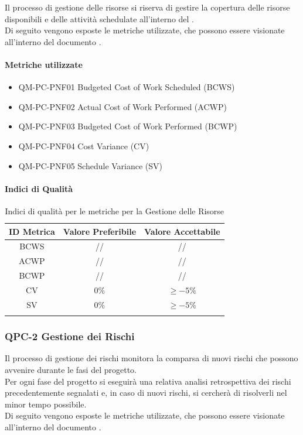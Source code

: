		Il processo di gestione delle risorse si riserva di gestire la copertura delle risorse disponibili e delle attività schedulate all'interno del . \\
		Di seguito vengono esposte le metriche utilizzate, che possono essere visionate all'interno del documento .\\

		\paragraph{Metriche utilizzate}

			\begin{itemize}
				\item QM-PC-PNF01 Budgeted Cost of Work Scheduled (BCWS)
				\item QM-PC-PNF02 Actual Cost of Work Performed (ACWP)
				\item QM-PC-PNF03 Budgeted Cost of Work Performed (BCWP)
				\item QM-PC-PNF04 Cost Variance (CV)
				\item QM-PC-PNF05 Schedule Variance (SV)
			\end{itemize}

		\paragraph{Indici di Qualità}

			\begin{center}
				\begin{longtable}{|c|c|c|}
				\hline
				\rowcolor{lighter-grayer}
				\textbf{ID Metrica} & \textbf{Valore Preferibile} & \textbf{Valore Accettabile}\\
				\hline
				\endfirsthead
				\hline
				BCWS & // & // \\
				\hline
				ACWP & // & // \\
				\hline
				BCWP & // & // \\
				\hline
				CV & \(0\%\) & \(\ge -5\%\) \\
				\hline
				SV & \(0\%\) & \(\ge -5\%\) \\
				\hline
				\caption{Indici di qualità per le metriche per la Gestione delle Risorse}
				\end{longtable}
			\end{center}

	\subsubsection{QPC-2 Gestione dei Rischi}
		Il processo di gestione dei rischi monitora la comparsa di nuovi rischi che possono avvenire durante le fasi del progetto.\\
		Per ogni fase del progetto si eseguirà una relativa analisi retrospettiva dei rischi precedentemente segnalati e, in caso di nuovi rischi, si cercherà di risolverli nel minor tempo possibile.\\
		Di seguito vengono esposte le metriche utilizzate, che possono essere visionate all'interno del documento .\\

